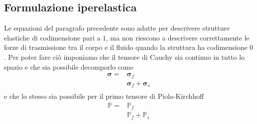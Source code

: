 \documentclass{book}
\begin{document}
\subsection{Formulazione iperelastica}
Le equazioni del paragrafo precedente sono adatte per descrivere strutture elastiche di codimensione pari a $1$, ma non riescono a descrivere correttamente le forze di trasmissione tra il corpo e il fluido quando la struttura ha codimensione $0$. Per poter fare ciò imponiamo che il tensore di Cauchy sia continuo in tutto lo spazio e che sia possibile decomporlo come
\begin{equation}
\begin{aligned}
\boldsymbol{\sigma} = &\boldsymbol{\sigma}_f\\
                    &\boldsymbol{\sigma}_f + \boldsymbol{\sigma}_s\\
\end{aligned}
\end{equation}
e che lo stesso sia possibile per il primo tensore di Piola-Kirchhoff
\begin{equation}
\begin{aligned}
\mathbb{P} = &\mathbb{P}_f\\
                    &\mathbb{P}_f + \mathbb{P}_s\\
\end{aligned}
\end{equation}
\end{document}
